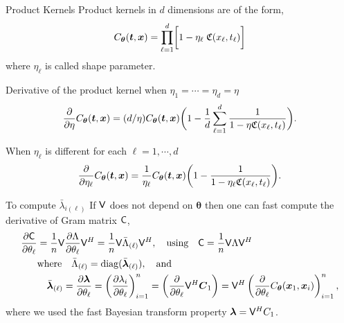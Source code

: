\documentclass[handout, 10pt,compress,xcolor={usenames,dvipsnames}]{beamer} %
\newcommand{\bm}[1]{\boldsymbol{#1}}
\renewcommand{\mLambda}{\Lambda}
\newcommand{\vC}{\bvec{C}}
\renewcommand{\vtheta}{{\bm{\theta}}}
\begin{document}
\begin{frame}{Product Kernels}
	\vspace{-3ex}
	Product kernels in $d$ dimensions are of the form,
	\begin{align}
	\label{eqn:prod_kernel}
	C_{\vtheta}(\vt, \vx) = 
	\prod_{\ell=1}^d \biggl[ 1 - \eta_\ell \; \mathfrak{C}(x_\ell,t_\ell) \biggr]
	\end{align}
	where $\eta_\ell$ is called shape parameter.
	
	Derivative of the product kernel when $\eta_1=\cdots=\eta_d=\eta$
	\begin{align*}
	\frac{\partial}{\partial \eta} C_{\vtheta}(\vt, \vx) = ({d}/{\eta} ) C_{\vtheta}(\vt, \vx) 
	\biggl(
	1 - 
	\frac{1}{d} \sum_{\ell=1}^d
	\frac{1}
	{ 1 - \eta \mathfrak{C}(x_\ell,t_\ell) }
	\biggr).
	\end{align*}
	
	When $\eta_\ell$ is different for each $\ell = 1,\cdots,d$
	\begin{align*}
	\frac{\partial}{\partial \eta_\ell} C_{\vtheta}(\vt, \vx) = \frac{1}{\eta_\ell} 
	{ C_{\vtheta}(\vt, \vx) }
	\biggl(
	1 - 
	\frac{1}
	{ 1 - \eta_\ell \mathfrak{C}(x_\ell,t_\ell) }
	\biggr).
	\end{align*}
\end{frame}








\begin{frame}{To compute $\bar{\lambda}_{i(\ell)}$}
	If $\mathsf{V}$ does not depend on $\vtheta$ then one can fast compute the derivative of Gram matrix $\mathsf{C}$,
	\begin{align}
	\nonumber
	\displaystyle \frac{\partial \mC}{\partial \theta_\ell} 
	& = \frac 1n \mV \frac{\partial {\mLambda}}{\partial \theta_\ell} \mV^H
	= \frac 1n \mV \bar{\mLambda}_{(\ell)} \mV^H, \quad
	\text{using} \quad  \mC = \frac 1n \mV \mLambda \mV^H
	\\
	\nonumber
	& \text{where} \quad \bar{\mLambda}_{(\ell)} = \diag(\bar{\vlambda}_{(\ell)}), \quad \text{and}
	\\
	\label{eqn:deriv_eigenval_gram_matrix}
	&  \quad \bar{\vlambda}_{(\ell)} = \frac{\partial \vlambda}{\partial \theta_\ell} = \left( \frac{\partial \lambda_i}{\partial \theta_\ell} \right)_{i=1}^n 
	= \left( \frac{\partial }{\partial \theta_\ell} \mV^H {\vC_1} \right)
	= \mV^H \left( \frac{\partial }{\partial \theta_\ell} {C_\vtheta(\vx_1,\vx_i)} \right)_{i=1}^n,
	\end{align}
	where we used the fast Bayesian transform property $\boldsymbol{\lambda} = \mathsf{V}^H C_1$. %
\end{frame}
\end{document}
